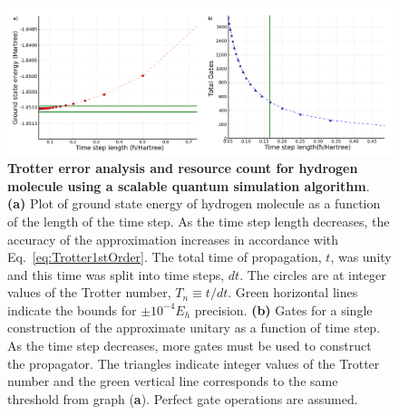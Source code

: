 \documentclass[11pt,oneside,final]{huthesis}%
\begin{document}
\begin{figure}
    \begin{center}
    \includegraphics[width=1\columnwidth]{./figures/H2plots.png}
    \end{center}
    \caption{\textbf{Trotter error analysis and resource count for hydrogen molecule using a 
scalable quantum simulation algorithm}. \textbf{(a)} Plot of ground state energy of hydrogen 
molecule as a function of the length of the time step. As the time step length decreases, the 
accuracy of the approximation increases in accordance with Eq.~\eqref{eq:Trotter1stOrder}.  
The total time of propagation, $t$, was unity and this time was split into time steps, $dt$.  The 
circles are at integer values of the Trotter number, $T_n\equiv t/dt$.  Green horizontal lines 
indicate the bounds for $\pm10^{-4}E_h$ precision.    \textbf{(b)} Gates for a single construction 
of the approximate unitary as a function of time step. As the time step decreases, more gates 
must be used to construct the propagator.  The triangles indicate integer values of the Trotter 
number and the green vertical line corresponds to the same threshold from graph (\textbf{a}).  Perfect 
gate operations are assumed.
}
    \label{fig:H2}
\end{figure}
\end{document}
